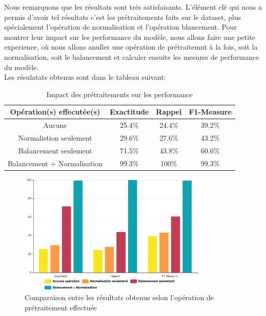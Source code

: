 Nous remarquons que les résultats sont trés satisfaisants. L'élément clé qui nous a permis d'avoir tel résultats c'est les prétraitements faits sur le dataset, plus spécialement l'opération de normalisation et l'opération blancement. Pour montrer leur impact  sur les performance du modèle, nous allons faire une petite experience, où nous allons anuller une opération de prétraitemnt à la fois, soit la normalisation, soit le balancement et calculer ensuite les mesures de performance du modèle.\\

Les résulatats obtenus sont dans le tableau suivant:
\begin{table}[h]
	\begin{center}
		\begin{tabular}{  | c | c | c | c | }
			\hline
			 Opération(s) effecutée(s) & Exactitude & Rappel & F1-Measure \\
			\hline
			\hline
			Aucune & 25.4\% & 24.4\% & 39.2\% \\
			\hline
			Normalistion seulement & 29.6\% & 27.6\% & 43.2\% \\
			\hline
			Balancement seulement & 71.5\% & 43.8\% & 60.6\% \\
			\hline
			\rowcolor[rgb]{0.75,0.75,0.75}
			Balancement + Normalisation & 99.3\% & 100\% & 99.3\% \\
			\hline
		\end{tabular}
		\caption{Impact des prétraitements sur les performance}
	\end{center}
	\label{table:compare}
\end{table}

\begin{figure}[h]
\centering
\includegraphics[width=0.8\textwidth]{Figures/performances}
\decoRule
\caption{Comparaison entre les résultats obtenus selon l'opération de prétraitement effectuée}
\label{fig:rDoS}
\end{figure} 

